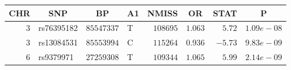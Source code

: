 \begin{center}
\begin{tabular}{rlrlrrrr}
\hline\hline
\multicolumn{1}{c}{CHR}&\multicolumn{1}{c}{SNP}&\multicolumn{1}{c}{BP}&\multicolumn{1}{c}{A1}&\multicolumn{1}{c}{NMISS}&\multicolumn{1}{c}{OR}&\multicolumn{1}{c}{STAT}&\multicolumn{1}{c}{P}\tabularnewline
\hline
$3$&rs76395182&$85547337$&T&$108695$&$1.063$&$ 5.72$&$1.09e-08$\tabularnewline
$3$&rs13084531&$85553994$&C&$115264$&$0.936$&$-5.73$&$9.83e-09$\tabularnewline
$6$&rs9379971&$27259308$&T&$109344$&$1.065$&$ 5.99$&$2.14e-09$\tabularnewline
\hline
\end{tabular}\end{center}
